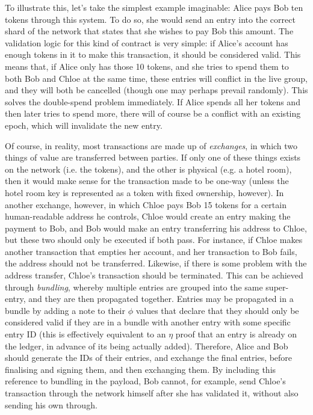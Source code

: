 \documentclass{extreport}
\begin{document}
To illustrate this, let's take the simplest example imaginable: Alice pays Bob ten tokens through this system. To do so, she would send an entry into the correct shard of the network that states that she wishes to pay Bob this amount. The validation logic for this kind of contract is very simple: if Alice's account has enough tokens in it to make this transaction, it should be considered valid. This means that, if Alice only has those 10 tokens, and she tries to spend them to both Bob and Chloe at the same time, these entries will conflict in the live group, and they will both be cancelled (though one may perhaps prevail randomly). This solves the double-spend problem immediately. If Alice spends all her tokens and then later tries to spend more, there will of course be a conflict with an existing epoch, which will invalidate the new entry.

Of course, in reality, most transactions are made up of \emph{exchanges}, in which two things of value are transferred between parties. If only one of these things exists on the network (i.e. the tokens), and the other is physical (e.g. a hotel room), then it would make sense for the transaction made to be one-way (unless the hotel room key is represented as a token with fixed ownership, however). In another exchange, however, in which Chloe pays Bob 15 tokens for a certain human-readable address he controls, Chloe would create an entry making the payment to Bob, and Bob would make an entry transferring his address to Chloe, but these two should only be executed if both pass. For instance, if Chloe makes another transaction that empties her account, and her transaction to Bob fails, the address should not be transferred. Likewise, if there is some problem with the address transfer, Chloe's transaction should be terminated. This can be achieved through \emph{bundling}, whereby multiple entries are grouped into the same super-entry, and they are then propagated together. Entries may be propagated in a bundle by adding a note to their \(\phi\) values that declare that they should only be considered valid if they are in a bundle with another entry with some specific entry ID (this is effectively equivalent to an \(\eta\) proof that an entry is already on the ledger, in advance of its being actually added). Therefore, Alice and Bob should generate the IDs of their entries, and exchange the final entries, before finalising and signing them, and then exchanging them. By including this reference to bundling in the payload, Bob cannot, for example, send Chloe's transaction through the network himself after she has validated it, without also sending his own through.
\end{document}
